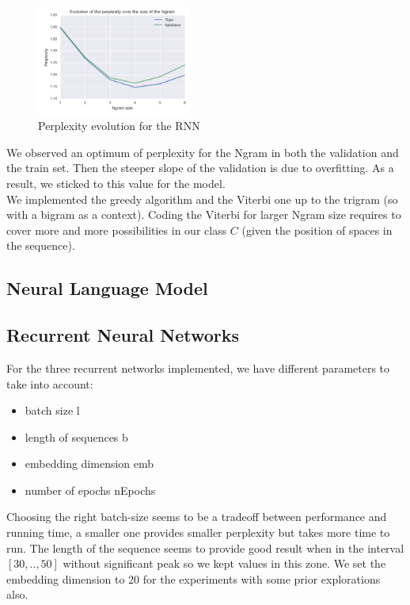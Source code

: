 \documentclass[11pt]{article}
\begin{document}
\begin{figure}[H]
\begin{center}
    \includegraphics[width=0.45\textwidth]{count_graph.png}
    \caption{Perplexity evolution for the RNN}
\end{center}
\end{figure}

We observed an optimum of perplexity for the Ngram in both the validation and the train set. Then the steeper slope of the validation is due to overfitting. As a result, we sticked to this value for the model.\\

We implemented the greedy algorithm and the Viterbi one up to the trigram (so with a bigram as a context). Coding the Viterbi for larger Ngram size requires to cover more and more possibilities in our class $C$ (given the position of spaces in the sequence). 


\subsection{Neural Language Model}


\subsection{Recurrent Neural Networks}

For the three recurrent networks implemented, we have different parameters to take into account: 
\begin{itemize}
	\item batch size l
	\item length of sequences b
	\item embedding dimension emb
	\item number of epochs nEpochs
\end{itemize}

Choosing the right batch-size seems to be a tradeoff between performance and running time, a smaller one provides smaller perplexity but takes more time to run. The length of the sequence seems to provide good result when in the interval $[30,..,50]$ without significant peak so we kept values in this zone. We set the embedding dimension to 20 for the experiments with some prior explorations also.
\end{document}
